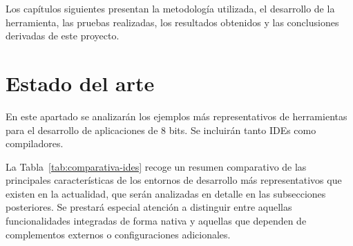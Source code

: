 \documentclass[../../main.tex]{subfiles}
\begin{document}
Los capítulos siguientes presentan la metodología utilizada, el desarrollo de la herramienta, las pruebas realizadas, los resultados obtenidos y las conclusiones derivadas de este proyecto.

\clearpage
\section{Estado del arte}
\label{S:estado_arte}

En este apartado se analizarán los ejemplos más representativos de herramientas para el desarrollo de aplicaciones de 8 bits. Se incluirán tanto IDEs como compiladores. 

\par{La Tabla~\ref{tab:comparativa-ides} recoge un resumen comparativo de las principales características de los entornos de desarrollo más representativos que existen en la actualidad, que serán analizadas en detalle en las subsecciones posteriores. Se prestará especial atención a distinguir entre aquellas funcionalidades integradas de forma nativa y aquellas que dependen de complementos externos o configuraciones adicionales.}
\end{document}
